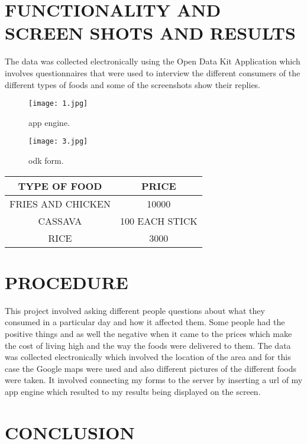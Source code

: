 \documentclass[14pt]{article}
\begin{document}
\section{FUNCTIONALITY AND SCREEN SHOTS AND RESULTS}

The data was collected electronically using the Open Data Kit Application which involves questionnaires that were used to interview the different consumers of the different types of foods and some of the screenshots show their replies.

\begin{figure}[h!]
\texttt{[image: 1.jpg]}
\caption{app engine.}
\label{figure1}
\end{figure}

\begin{figure}[h!]
\texttt{[image: 3.jpg]}
\caption{odk form.}
\label{figure2}
\end{figure}


\begin{table}[h]
\centering
\begin{tabular}{c c }
\hline
TYPE OF FOOD &	PRICE \\[0.5ex] 
\hline
FRIES AND CHICKEN & 10000\\
CASSAVA &	100 EACH STICK\\ 
RICE &	3000\\ 
\hline
\end{tabular}
\end{table}

\section{PROCEDURE}

This project involved asking different people questions about what they consumed in a particular day and how it affected them. Some people had the positive things and as well the negative when it came to the prices which make the cost of living high and the way the foods were delivered to them.
The data was collected electronically which involved the location of the area and for this case the Google maps were used and also different pictures of the different foods were taken. It involved connecting my forms to the server by inserting a url of my app engine which resulted to my results being displayed on the screen.

\section{CONCLUSION}
\end{document}
